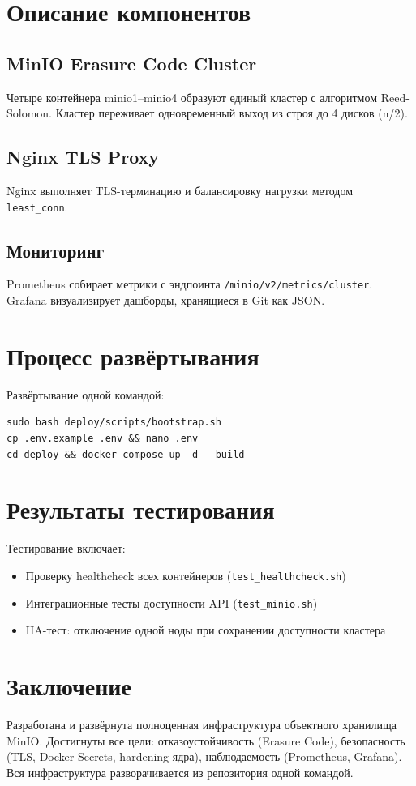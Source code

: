 \documentclass[14pt,a4paper]{extreport}
\begin{document}
\chapter{Описание компонентов}

\section{MinIO Erasure Code Cluster}
Четыре контейнера minio1--minio4 образуют единый кластер с алгоритмом Reed-Solomon.
Кластер переживает одновременный выход из строя до 4 дисков (n/2).

\section{Nginx TLS Proxy}
Nginx выполняет TLS-терминацию и балансировку нагрузки методом \texttt{least\_conn}.

\section{Мониторинг}
Prometheus собирает метрики с эндпоинта \texttt{/minio/v2/metrics/cluster}.
Grafana визуализирует дашборды, хранящиеся в Git как JSON.

\chapter{Процесс развёртывания}

Развёртывание одной командой:
\begin{verbatim}
sudo bash deploy/scripts/bootstrap.sh
cp .env.example .env && nano .env
cd deploy && docker compose up -d --build
\end{verbatim}

\chapter{Результаты тестирования}

Тестирование включает:
\begin{itemize}
  \item Проверку healthcheck всех контейнеров (\texttt{test\_healthcheck.sh})
  \item Интеграционные тесты доступности API (\texttt{test\_minio.sh})
  \item HA-тест: отключение одной ноды при сохранении доступности кластера
\end{itemize}

\chapter{Заключение}

Разработана и развёрнута полноценная инфраструктура объектного хранилища MinIO.
Достигнуты все цели: отказоустойчивость (Erasure Code), безопасность (TLS, Docker Secrets,
hardening ядра), наблюдаемость (Prometheus, Grafana). Вся инфраструктура разворачивается
из репозитория одной командой.
\end{document}
